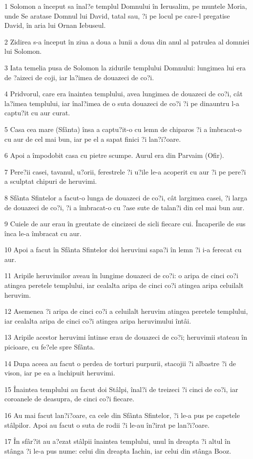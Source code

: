 \par 1 Solomon a început sa înal?e templul Domnului în Ierusalim, pe muntele Moria, unde Se aratase Domnul lui David, tatal sau, ?i pe locul pe care-l pregatise David, în aria lui Ornan Iebuseul.
\par 2 Zidirea s-a început în ziua a doua a lunii a doua din anul al patrulea al domniei lui Solomon.
\par 3 Iata temelia pusa de Solomon la zidurile templului Domnului: lungimea lui era de ?aizeci de coji, iar la?imea de douazeci de co?i.
\par 4 Pridvorul, care era înaintea templului, avea lungimea de douazeci de co?i, cât la?imea templului, iar înal?imea de o suta douazeci de co?i ?i pe dinauntru l-a captu?it cu aur curat.
\par 5 Casa cea mare (Sfânta) însa a captu?it-o cu lemn de chiparos ?i a îmbracat-o cu aur de cel mai bun, iar pe el a sapat finici ?i lan?i?oare.
\par 6 Apoi a împodobit casa cu pietre scumpe. Aurul era din Parvaim (Ofir).
\par 7 Pere?ii casei, tavanul, u?orii, ferestrele ?i u?ile le-a acoperit cu aur ?i pe pere?i a sculptat chipuri de heruvimi.
\par 8 Sfânta Sfintelor a facut-o lunga de douazeci de co?i, cât largimea casei, ?i larga de douazeci de co?i, ?i a îmbracat-o cu ?ase sute de talan?i din cel mai bun aur.
\par 9 Cuiele de aur erau în greutate de cincizeci de sicli fiecare cui. Încaperile de sus înca le-a îmbracat cu aur.
\par 10 Apoi a facut în Sfânta Sfintelor doi heruvimi sapa?i în lemn ?i i-a ferecat cu aur.
\par 11 Aripile heruvimilor aveau în lungime douazeci de co?i: o aripa de cinci co?i atingea peretele templului, iar cealalta aripa de cinci co?i atingea aripa celuilalt heruvim.
\par 12 Asemenea ?i aripa de cinci co?i a celuilalt heruvim atingea peretele templului, iar cealalta aripa de cinci co?i atingea aripa heruvimului întâi.
\par 13 Aripile acestor heruvimi întinse erau de douazeci de co?i; heruvimii stateau în picioare, cu fe?ele spre Sfânta.
\par 14 Dupa aceea au facut o perdea de torturi purpurii, stacojii ?i albastre ?i de vison, iar pe ea a închipuit heruvimi.
\par 15 Înaintea templului au facut doi Stâlpi, înal?i de treizeci ?i cinci de co?i, iar coroanele de deasupra, de cinci co?i fiecare.
\par 16 Au mai facut lan?i?oare, ca cele din Sfânta Sfintelor, ?i le-a pus pe capetele stâlpilor. Apoi au facut o suta de rodii ?i le-au în?irat pe lan?i?oare.
\par 17 În sfâr?it au a?ezat stâlpii înaintea templului, unul în dreapta ?i altul în stânga ?i le-a pus nume: celui din dreapta Iachin, iar celui din stânga Booz.

